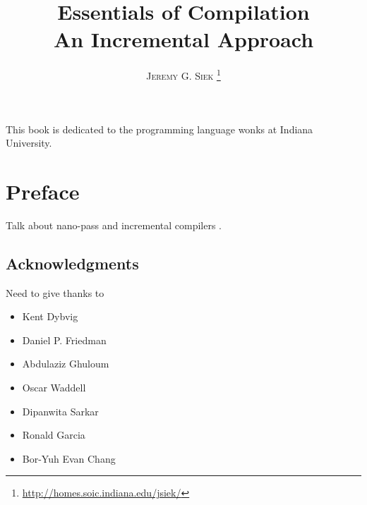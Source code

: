 \documentclass[12pt]{book}
\title{\Huge \textbf{Essentials of Compilation} \\ 
  \huge An Incremental Approach}
\author{\textsc{Jeremy G. Siek}
   \thanks{\url{http://homes.soic.indiana.edu/jsiek/}}
   }
\newenvironment{dedication}
{
   \cleardoublepage
   \thispagestyle{empty}
   \vspace*{\stretch{1}}
   \hfill\begin{minipage}[t]{0.66\textwidth}
   \raggedright
}
{
   \end{minipage}
   \vspace*{\stretch{3}}
   \clearpage
}
\begin{document}
\frontmatter
\maketitle

\begin{dedication}
This book is dedicated to the programming language wonks at Indiana
University.
\end{dedication}

\tableofcontents

\mainmatter

\chapter*{Preface}

Talk about nano-pass \citep{Sarkar:2004fk,Keep:2012aa} and incremental
compilers \citep{Ghuloum:2006bh}.



\section*{Acknowledgments}

Need to give thanks to 
\begin{itemize}
\item Kent Dybvig
\item Daniel P. Friedman
\item Abdulaziz Ghuloum
\item Oscar Waddell
\item Dipanwita Sarkar
\item Ronald Garcia
\item Bor-Yuh Evan Chang
\end{itemize}
\end{document}
